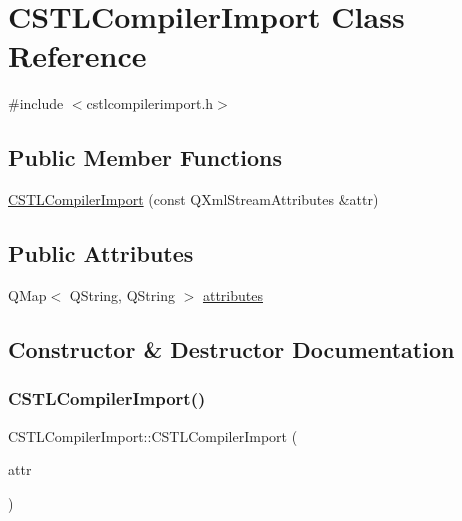 \hypertarget{class_c_s_t_l_compiler_import}{}\section{C\+S\+T\+L\+Compiler\+Import Class Reference}
\label{class_c_s_t_l_compiler_import}


{\ttfamily \#include $<$cstlcompilerimport.\+h$>$}

\subsection*{Public Member Functions}
\begin{DoxyCompactItemize}
\item 
\hyperlink{class_c_s_t_l_compiler_import_abf33061095db67280137700dd9c778fc}{C\+S\+T\+L\+Compiler\+Import} (const Q\+Xml\+Stream\+Attributes \&attr)
\end{DoxyCompactItemize}
\subsection*{Public Attributes}
\begin{DoxyCompactItemize}
\item 
Q\+Map$<$ Q\+String, Q\+String $>$ \hyperlink{class_c_s_t_l_compiler_import_a7a5f0f43548ad8f6dd24e3d8f2b5a19c}{attributes}
\end{DoxyCompactItemize}


\subsection{Constructor \& Destructor Documentation}
\mbox{\label{class_c_s_t_l_compiler_import_abf33061095db67280137700dd9c778fc}} 
\subsubsection{\texorpdfstring{C\+S\+T\+L\+Compiler\+Import()}{CSTLCompilerImport()}}
{\footnotesize\ttfamily C\+S\+T\+L\+Compiler\+Import\+::\+C\+S\+T\+L\+Compiler\+Import (\begin{DoxyParamCaption}\item[{const Q\+Xml\+Stream\+Attributes \&}]{attr }\end{DoxyParamCaption})\hspace{0.3cm}{\ttfamily [explicit]}}



